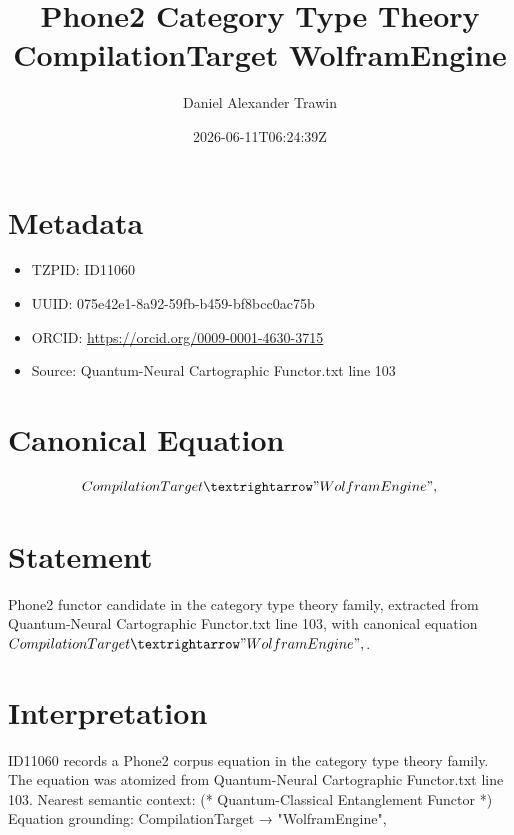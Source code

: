 \documentclass[11pt]{article}
\title{Phone2 Category Type Theory CompilationTarget WolframEngine}
\author{Daniel Alexander Trawin}
\date{2026-06-11T06:24:39Z}
\begin{document}
\maketitle
\section*{Metadata}
\begin{itemize}
\item TZPID: ID11060
\item UUID: 075e42e1-8a92-59fb-b459-bf8bcc0ac75b
\item ORCID: \url{https://orcid.org/0009-0001-4630-3715}
\item Source: Quantum-Neural Cartographic Functor.txt line 103
\end{itemize}
\section*{Canonical Equation}
\[
CompilationTarget → "WolframEngine",
\]
\section*{Statement}
Phone2 functor candidate in the category type theory family, extracted from Quantum-Neural Cartographic Functor.txt line 103, with canonical equation $CompilationTarget → "WolframEngine",$.
\section*{Interpretation}
ID11060 records a Phone2 corpus equation in the category type theory family. The equation was atomized from Quantum-Neural Cartographic Functor.txt line 103. Nearest semantic context: (* Quantum-Classical Entanglement Functor *) Equation grounding: CompilationTarget → "WolframEngine",
\end{document}
